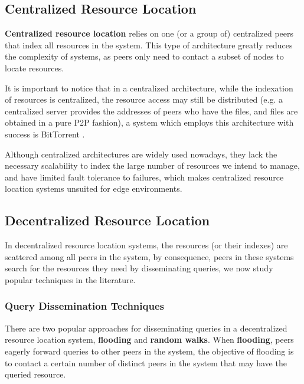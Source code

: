 \subsection{Centralized Resource Location}

\textbf{Centralized resource location} relies on one (or a group of) centralized peers that index all resources in the system. This type of architecture greatly reduces the complexity of systems, as peers only need to contact a subset of nodes to locate resources. 

It is important to notice that in a centralized architecture, while the indexation of resources is centralized, the resource access may still be distributed (e.g. a centralized server provides the addresses of peers who have the files, and files are obtained in a pure P2P fashion), a system which employs this architecture with success is BitTorrent \cite{cohen2003incentives}.

Although centralized architectures are widely used nowadays, they lack the necessary scalability to index the large number of resources we intend to manage, and have limited fault tolerance to failures, which makes centralized resource location systems unsuited for edge environments. 


\subsection{Decentralized Resource Location}

In decentralized resource location systems, the resources (or their indexes) are scattered among all peers in the system, by consequence, peers in these systems search for the resources they need by disseminating queries, we now study popular techniques in the literature.

\subsubsection{Query Dissemination Techniques}

There are two popular approaches for disseminating queries in a decentralized resource location system, \textbf{flooding} and \textbf{random walks}. When \textbf{flooding}, peers eagerly forward queries to other peers in the system, the objective of flooding is to contact a certain number of distinct peers in the system that may have the queried resource.


